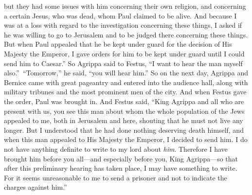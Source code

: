 \begin{biblechapter}
\verse but they had some issues with him concerning their own religion, and concerning a certain Jesus, who was dead, whom Paul claimed to be alive.
\verse And because I was at a loss with regard to the investigation concerning these things, I asked if he was willing to go to Jerusalem and to be judged there concerning these things.
\verse But when Paul appealed that he be kept under guard for the decision of His Majesty the Emperor, I gave orders for him to be kept under guard until I could send him to Caesar.”
\verse So Agrippa said to Festus, “I want to hear the man myself also.” “Tomorrow,” he said, “you will hear him.”
\verse So on the next day, Agrippa and Bernice came with great pageantry and entered into the audience hall, along with military tribunes and the most prominent men of the city. And when Festus gave the order, Paul was brought in.
\verse And Festus said, “King Agrippa and all who are present with us, you see this man about whom the whole population of the Jews appealed to me, both in Jerusalem and here, shouting that he must not live any longer.
\verse But I understood that he had done nothing deserving death himself, and when this man appealed to His Majesty the Emperor, I decided to send him.
\verse I do not have anything definite to write to my lord about \textit{him}. Therefore I have brought him before you all—and especially before you, King Agrippa—so that after this preliminary hearing has taken place, I may have something to write.
\verse For it seems unreasonable to me to send a prisoner and not to indicate the charges against him.”
\end{biblechapter}

